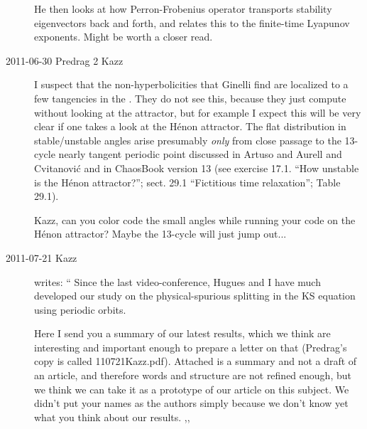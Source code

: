 \begin{description}
He then looks at how Perron-Frobenius operator transports
stability eigenvectors back and forth, and relates this to
the finite-time Lyapunov exponents. Might be worth a closer read.

\item[2011-06-30 Predrag 2 Kazz]
I suspect that the  non-hyperbolicities
that Ginelli\etal{} find are localized to a few tangencies
in the \statesp. They do not see this, because they just compute without looking
at the attractor, but for example I expect this will be very clear if one takes a
look at the H\'enon attractor. The flat distribution in stable/unstable angles
arise presumably {\em only} from close passage to the 13-cycle nearly tangent
periodic point discussed in
Artuso and Aurell and Cvitanovi{\'{c}}
and in ChaosBook version 13
(see exercise 17.1. ``How unstable is the H\'enon attractor?'';
sect. 29.1 ``Fictitious time relaxation'';
Table 29.1).

Kazz, can you color code the small angles while running your code on the
H\'enon attractor? Maybe the 13-cycle will just jump out...

\item[2011-07-21 Kazz] writes:
``
Since the last video-conference, Hugues and I have much developed our
study on the physical-spurious splitting in the KS equation using
periodic orbits.

Here I send you a summary of our latest results, which we think are
interesting and important enough to prepare a letter on that (Predrag's
copy is called 110721Kazz.pdf). Attached is a summary and not a draft of
an article, and therefore words and structure are not refined enough, but
we think we can take it as a prototype of our article on this subject. We
didn't put your names as the authors simply because we don't know yet
what you think about our results.
,,


\end{description}

\renewcommand{\ssp}{a}
